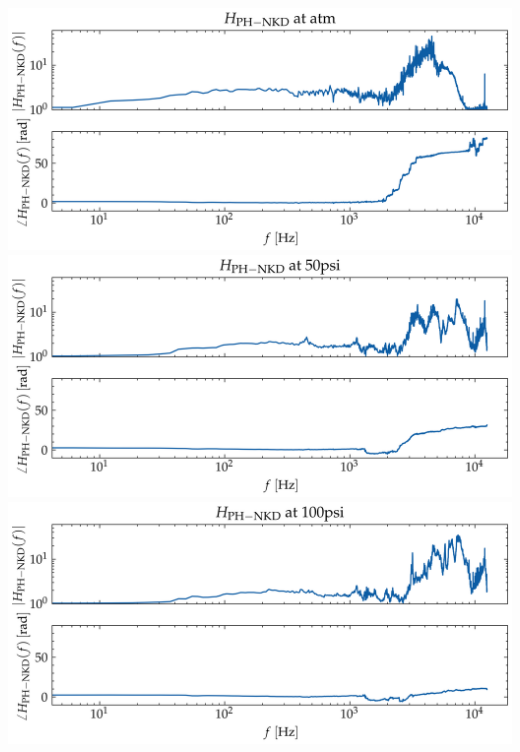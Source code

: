 \documentclass[aspectratio=169,10pt]{beamer}
\begin{document}
\begin{frame}
\begin{columns}[c]
\begin{tikzpicture}[scale=0.7, transform shape,
                node distance=6mm and 18mm, every node/.style={font=\small}]
            \end{tikzpicture}
            \includegraphics[width=0.8\linewidth]{PH-NKD/H_atm.png}
            \includegraphics[width=0.8\linewidth]{PH-NKD/H_50psi.png}
            \includegraphics[width=0.8\linewidth]{PH-NKD/H_100psi.png}
    \end{columns}
\end{frame}
\end{document}
